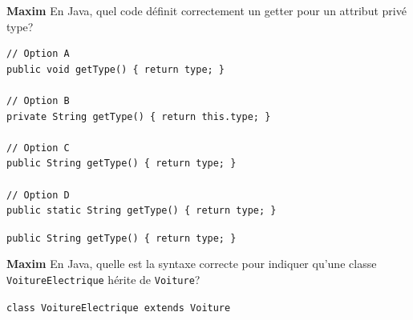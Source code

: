 
\begin{Exercice}[5 minutes]\textbf{Maxim}
En Java, quel code définit correctement un getter pour un attribut privé type?

\begin{lstlisting}[style=javastyle]
// Option A
public void getType() { return type; }

// Option B
private String getType() { return this.type; }

// Option C
public String getType() { return type; }

// Option D
public static String getType() { return type; }
\end{lstlisting}

\begin{solution}
\texttt{public String getType() \{ return type; \}}
\end{solution}

\end{Exercice}

\begin{Exercice}[5 minutes]\textbf{Maxim}
En Java, quelle est la syntaxe correcte pour indiquer qu’une classe \texttt{VoitureElectrique} hérite de \texttt{Voiture}?

\begin{solution}
\texttt{class VoitureElectrique extends Voiture}
\end{solution}

\end{Exercice}

